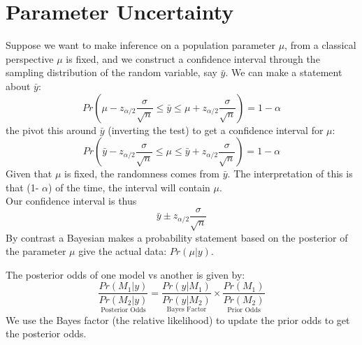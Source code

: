 \documentclass[DIV=14,titlepage=false]{scrreprt}
\begin{document}
\section{Parameter Uncertainty}
Suppose we want to make inference on a population parameter $\mu$, from a classical perspective $\mu$ is fixed, and we construct a confidence interval through the sampling distribution of the random variable, say $\bar{y}$. We can make a statement about $\bar y$:
\[
    Pr(\mu - z_{\alpha/2}\frac{\sigma}{\sqrt{n}} \leq \bar{y} \leq \mu + z_{\alpha/2}\frac{\sigma}{\sqrt{n}}) = 1-\alpha
\]
the  pivot this around $\bar y$ (inverting the test) to get a confidence interval for $\mu$:
\[
    Pr(\bar{y} - z_{\alpha/2}\frac{\sigma}{\sqrt{n}} \leq \mu \leq \bar{y} + z_{\alpha/2}\frac{\sigma}{\sqrt{n}}) = 1-\alpha
\]
Given that $\mu$ is fixed, the randomness comes from $\bar{y}$. The interpretation of this is that (1- $\alpha$) of the time, the interval will contain $\mu$.\\
Our confidence interval is thus 
\[
   \bar y \pm z_{\alpha/2}\frac{\sigma}{\sqrt{n}} 
\]
By contrast a Bayesian makes a probability statement based on the posterior of the parameter $\mu$ give the actual data: $Pr(\mu|y)$. 
\begin{definition}
    The posterior odds of one model vs another is given by:
    \[
        \underset{\text{Posterior Odds}}{\frac{Pr(M_1|y)}{Pr(M_2|y)}} = \underset{\text{Bayes Factor}}{\frac{Pr(y|M_1)}{Pr(y|M_2)}}\times\underset{\text{Prior Odds}}{\frac{Pr(M_1)}{Pr(M_2)}}
    \]
    We use the Bayes factor (the relative likelihood) to update the prior odds to get the posterior odds.
\end{definition}
\end{document}
